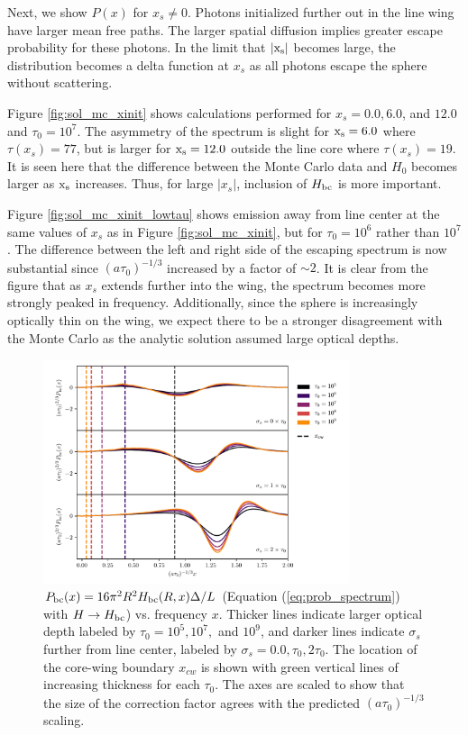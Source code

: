 \documentclass[linenumbers]{aastex63}
\begin{document}
Next, we show $P(x)$ for $x_s \neq 0$. Photons initialized further out in the line wing have larger mean free paths. The larger spatial diffusion implies greater escape probability for these photons. In the limit that $|\rm x_s|$ becomes large, the distribution becomes a delta function at $x_s$ as all photons escape the sphere without scattering. 

Figure \ref{fig:sol_mc_xinit} shows calculations performed for $x_s = 0.0, 6.0$, and $12.0$ and $\tau_0=10^7$. The asymmetry of the spectrum is slight for $\rm x_s = 6.0$ where $\tau(x_s)=77$, but is larger for $\rm x_s=12.0$ outside the line core where $\tau(x_s)=19$. It is seen here that the difference between the Monte Carlo data and $H_0$ becomes larger as $\rm x_s$ increases. Thus, for large $|x_s|$, inclusion of $H_{\rm bc}$ is more important.

Figure \ref{fig:sol_mc_xinit_lowtau} shows emission away from line center at the same values of $x_s$ as in Figure \ref{fig:sol_mc_xinit}, but for $\tau_0=10^6$ rather than $10^7$. The difference between the left and right side of the escaping spectrum is now substantial since $(a\tau_0)^{-1/3}$ increased by a factor of ${\sim}2$. It is clear from the figure that as $x_s$ extends further into the wing, the spectrum becomes more strongly peaked in frequency. Additionally, since the sphere is increasingly optically thin on the wing, we expect there to be a stronger disagreement with the Monte Carlo as the analytic solution assumed large optical depths.

\begin{figure}
    \centering
    \includegraphics[width=0.8\textwidth]{xinit.pdf}
    \caption{$P_{\rm bc}(x) = 16\pi^2R^2H_{\rm bc}(R, x)\Delta/L$ (Equation (\ref{eq:prob_spectrum}) with $H \rightarrow H_{\rm bc}$) vs. frequency $x$. Thicker lines indicate larger optical depth labeled by $\tau_0=10^5, 10^7,$ and $10^9$, and darker lines indicate $\sigma_s$ further from line center, labeled by $\sigma_s=0.0, \tau_0, 2\tau_0$. The location of the core-wing boundary $x_{cw}$ is shown with green vertical lines of increasing thickness for each $\tau_0$. The axes are scaled to show that the size of the correction factor agrees with the predicted $(a\tau_0)^{-1/3}$ scaling.}
    \label{fig:xinit}
\end{figure}
\end{document}
